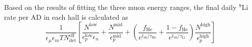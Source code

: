 \documentclass[../thesis.tex]{subfiles}
\begin{document}
Based on the results of fitting the three muon energy ranges, the final daily $^9$Li rate per AD in each hall is calculated as
\begin{equation}
  \label{eq:bkgLi9DailyRate}
  \frac{1}{\epsilon_\mu \epsilon_m T N^{\mathrm{eff}}_{\mathrm{det}}}
  \left[  \frac{N^{\mathrm{low}}}{\epsilon^{\mathrm{low}}_p \epsilon_n} 
    + \frac{N^{\mathrm{mid}}}{\epsilon_p^{\mathrm{mid}}}
    + \left( \frac{f_{\mathrm{He}}}{e^{t_{\mathrm{sh}} / \tau_{\mathrm{He}}}} + \frac{1 - f_{\mathrm{He}}}{e^{t_{\mathrm{sh}} / \tau_{\mathrm{Li}}}} \right) \frac{N^{\mathrm{high}}}{\epsilon_p^{\mathrm{high}}}
  \right]
\end{equation}
\end{document}
